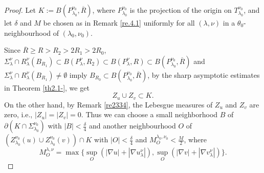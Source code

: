 \documentclass[12pt]{amsart}
\theoremstyle{definition}
\theoremstyle{remark}
\theoremstyle{conclusion}
\theoremstyle{conjecture}
\numberwithin{equation}{section}
\begin{document}
\begin{proof}
Let $K:=B(P_{\lambda_0}^{\nu_0},\overline{R})$, where $P_{\lambda_0}^{\nu_0}$ is the projection of the origin on $T_{\lambda_0}^{\nu_0}$, and let $\delta$ and $M$ be chosen as in Remark \ref{re.4.1} uniformly for all $(\lambda,\nu)$ in a $\theta_0$-neighbourhood of $(\lambda_0,\nu_0)$.

Since $\overline{R}\geq R>R_{2}>2R_{1}>2R_{0}$, $\Sigma_\lambda^\nu \cap R_\lambda^\nu(B_{R_1}) \subset B(P_\lambda^\nu,R_2) \subset B(P_\lambda^\nu,R)\subset B(P_{\lambda_0}^{\nu_0},\overline{R})$ and $\Sigma_\lambda^\nu \cap R_\lambda^\nu(B_{R_1}) \neq \emptyset$ imply $B_{R_0}\subset B(P_{\lambda_0}^{\nu_{0}},\overline{R})$, by the sharp asymptotic estimates in Theorem \ref{th2.1-}, we get
$$Z_u\cup Z_v\subset K.$$
On the other hand, by Remark \ref{re2334}, the Lebesgue measures of $Z_{u}$ and $Z_{v}$ are zero, i.e., $|Z_u|=|Z_v|=0$.  Thus we can choose a small neighborhood $B$ of $\partial\left(K\cap \Sigma_{\lambda_0}^{\nu_0}\right)$ with $|B|<\frac{\delta}{4}$ and another neighbourhood $O$ of $(Z_{\lambda_0}^{\nu_0}(u)\cup Z_{\lambda_0}^{\nu_0}(v)) \cap K$ with $|O|<\frac{\delta}{4}$ and $M_O^{\lambda_0,\nu_0}<\frac{M}{2}$, where
$$ M_O^{\lambda,\nu}=\max\{\sup_O (|\nabla u|+|\nabla u^{\nu}_{\lambda}|), \sup_O (|\nabla v|+|\nabla v^{\nu}_{\lambda}|)\} .$$


\end{proof}
\end{document}
